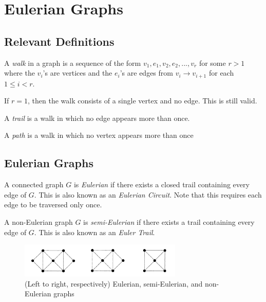 \chapter{Eulerian Graphs}

\section{Relevant Definitions}

\begin{definition}[Walk]
  A \textit{walk} in a graph is a sequence of the form \(v_1, e_1, v_2, e_2,
  ..., v_r\) for some \(r > 1\) where the \(v_i\)'s are vertices and the
  \(e_i\)'s are edges from \(v_i \to v_{i+1}\) for each \(1 \leq i < r\).
\end{definition}

\begin{remark}
  If \(r = 1\), then the walk consists of a single vertex and no edge. This is
  still valid.
\end{remark}

\begin{definition}[Trail]
  A \textit{trail} is a walk in which no edge appears more than once.
\end{definition}

\begin{definition}
  A \textit{path} is a walk in which no vertex appears more than once
\end{definition}

\section{Eulerian Graphs}

\begin{definition}
  A connected graph \(G\) is \textit{Eulerian} if there exists a closed trail
  containing every edge of \(G\). This is also known as an \textit{Eulerian
  Circuit}. Note that this requires each edge to be traversed only once.
\end{definition}

\begin{definition}
  A non-Eulerian graph \(G\) is \textit{semi-Eulerian} if there exists a trail
  containing every edge of \(G\). This is also known as an \textit{Euler Trail}.
\end{definition}

\begin{figure}[ht]
  \begin{center}
    \includegraphics[width=0.69\textwidth]{figures/l02/eulerian-graphs}
  \end{center}
  \caption{(Left to right, respectively) Eulerian, semi-Eulerian, and non-Eulerian graphs}\label{fig:eulerian-graphs}
\end{figure}


